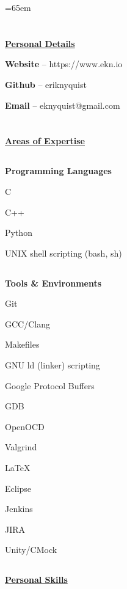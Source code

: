 \documentclass[6pt]{article}
\begin{document}
%
%
\hspace*{-\parindent}%
\begin{minipage}{15em}
\textheight=65em
\section*{}
{\selectfont \underline{\textbf{Personal Details}}}
\break

{\small {\bfseries Website} -- https://www.ekn.io

{\bfseries Github} -- eriknyquist

{\bfseries Email} -- eknyquist@gmail.com}

\section*{}
{\selectfont \underline{\textbf{Areas of Expertise}}}
\subsection*{}
{\textbf{Programming Languages}}

{\small C

C++

Python

UNIX shell scripting (bash, sh)}

\subsection*{}
{\textbf{Tools \& Environments}}

{\small Git

GCC/Clang

Makefiles

GNU ld (linker) scripting

Google Protocol Buffers

GDB

OpenOCD

Valgrind

{\LaTeX}

Eclipse

Jenkins

JIRA

Unity/CMock}

\subsection*{}
{\selectfont \underline{\textbf{Personal Skills}}}


\end{minipage}
\end{document}
